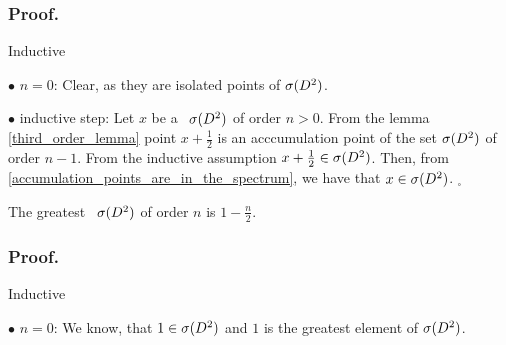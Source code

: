 \subsubsection{Proof.}
Inductive 

$\bullet$ $n=0$: Clear, as they are isolated points of ${{\sigma}(D^2)}$. 

$\bullet$ inductive step: Let $x$ be a \apots\  ${{\sigma}(D^2)}$ of order $n>0$. From the lemma 
\ref{third_order_lemma} point $x+\frac{1}{2}$ is an acccumulation point of the set ${{\sigma}(D^2)}$  
of order $n-1$. From the inductive assumption $x+\frac{1}{2} \in {{\sigma}(D^2)}$. Then, 
from \ref{accumulation_points_are_in_the_spectrum}, we have that $x \in {{\sigma}(D^2)}$. 
$_\square$ 

\begin{theorem}\label{greatest \apots}
The greatest \apots\ ${{\sigma}(D^2)}$ of order $n$ is $1-\frac{n}{2}$.
\end{theorem}
\subsubsection{Proof.}
Inductive 

$\bullet$ $n=0$: We know, that $1\in {{\sigma}(D^2)}$ and $1$ is the greatest element of ${{\sigma}(D^2)}$. 

